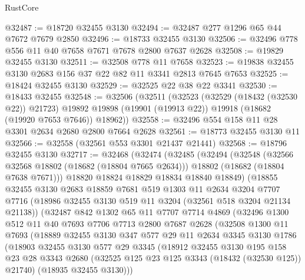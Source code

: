 \begin{lexlean}{RustCore}
\begin{coremodule}
@32487 := @18720 @32455 @3130
@32494 := @32487 @277 @1296 @65 @44 @7672 @7679 @2850
@32496 := @18733 @32455 @3130
@32506 := @32496 @778 @556 @11 @40 @7658 @7671 @7678 @2800 @7637 @2628
@32508 := @19829 @32455 @3130
@32511 := @32508 @778 @11 @7658
@32523 := @19838 @32455 @3130 @2683 @156 @37 @22 @82 @11 @3341 @2813 @7645 @7653
@32525 := @18424 @32455 @3130
@32529 := @32525 @22 @38 @22 @3341
@32530 := @18433 @32455
@32548 := @32506
    (@32511
      (@32523
        (@32529 (@18432 (@32530 @22)) @21723)
        @19892
        @19898
        (@19901 (@19913 @22))
        @19918
        (@18682 (@19920 @7653 @7646))
        @18962))
@32558 := @32496 @554 @158 @11 @28 @3301 @2634 @2680 @2800 @7664 @2628
@32561 := @18773 @32455 @3130 @11
@32566 := @32558 (@32561 @553 @3301 @21437 @21441)
@32568 := @18796 @32455 @3130
@32717 := @32468
    (@32474
      (@32485
        (@32494
          (@32548
            (@32566 @32568 @18802 (@18682 (@18804 @7665 @2634)))
            @18802
            (@18682 (@18804 @7638 @7671)))
          @18820
          @18824
          @18829
          @18834
          @18840
          @18849)
        (@18855
          @32455
          @3130
          @2683
          @18859
          @7681
          @519
          @1303
          @11
          @2634
          @3204
          @7707
          @7716
          (@18986 @32455 @3130 @519 @11 @3204 (@32561 @518 @3204 @21134 @21138))
          (@32487
            @842
            @1302
            @65
            @11
            @7707
            @7714
            @4869
            (@32496
              @1300
              @512
              @11
              @40
              @7693
              @7706
              @7713
              @2800
              @7687
              @2628
              (@32508
                @1300
                @11
                @7693
                (@18889
                  @32455
                  @3130
                  @347
                  @577
                  @29
                  @11
                  @2634
                  @3345
                  @3130
                  @1786
                  (@18903
                    @32455
                    @3130
                    @577
                    @29
                    @3345
                    (@18912
                      @32455
                      @3130
                      @195
                      @158
                      @23
                      @28
                      @3343
                      @2680
                      (@32525 @125 @23 @125 @3343 (@18432 (@32530 @125)) @21740)
                      (@18935 @32455 @3130)))

\end{coremodule}
\end{lexlean}
